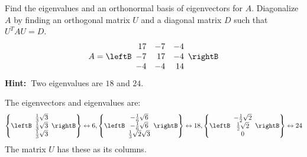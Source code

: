 \begin{enumialphparenastyle}
\begin{ex} Find the eigenvalues and an orthonormal basis of eigenvectors for $A.$
Diagonalize $A$ by finding an orthogonal matrix $U$ and a diagonal matrix $D$
such that $U^{T}AU=D$. 
\begin{equation*}
A=\leftB 
\begin{array}{rrr}
17 & -7 & -4 \\ 
-7 & 17 & -4 \\ 
-4 & -4 & 14
\end{array}
\rightB 
\end{equation*}
\textbf{Hint:\ }Two eigenvalues are $18$ and $24$.
\begin{sol}
The eigenvectors and eigenvalues are:
\[
\left\{ \leftB
\begin{array}{c}
\frac{1}{3}\sqrt{3} \\
\frac{1}{3}\sqrt{3} \\
\frac{1}{3}\sqrt{3}
\end{array}
\rightB \right\} \leftrightarrow 6,\left\{ \leftB
\begin{array}{c}
-\frac{1}{6}\sqrt{6} \\
-\frac{1}{6}\sqrt{6} \\
\frac{1}{3}\sqrt{2}\sqrt{3}
\end{array}
\rightB \right\} \leftrightarrow 18,\left\{ \leftB
\begin{array}{c}
-\frac{1}{2}\sqrt{2} \\
\frac{1}{2}\sqrt{2} \\
0
\end{array}
\rightB \right\} \leftrightarrow 24
\]
The matrix $U$ has these as its columns.
\end{sol}
\end{ex}


\end{enumialphparenastyle}
